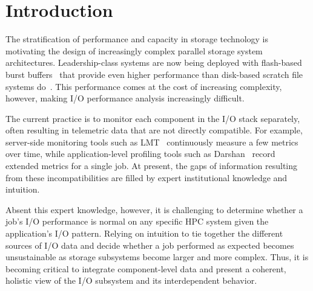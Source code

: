 \section{Introduction} \label{sec:introduction}

The stratification of performance and capacity in storage technology is motivating the design of increasingly complex parallel storage system architectures.
Leadership-class systems are now being deployed with flash-based burst buffers~\cite{Henseler2016} that provide even higher performance than disk-based scratch file systems do~\cite{Bhimji2016}.
This performance comes at the cost of increasing complexity, however, making I/O performance analysis increasingly difficult.

The current practice is to monitor each component in the I/O stack
separately, often resulting in telemetric data that are not directly compatible.
For example, server-side monitoring tools such as LMT~\cite{lmt}
continuously measure a few metrics over time, while application-level
profiling tools such as Darshan~\cite{carns200924} record extended metrics
for a single job.
At present, the gaps of information resulting from these incompatibilities are filled by expert institutional knowledge and intuition.

Absent this expert knowledge, however, it is challenging to determine whether a job's I/O performance is normal on any specific HPC system given the application's I/O pattern.
Relying on intuition to tie together the different sources of I/O data and decide whether a job performed as expected becomes unsustainable as storage subsystems become larger and more complex.  
Thus, it is becoming critical to integrate component-level data and present a coherent, holistic view of the I/O subsystem and its interdependent behavior.

